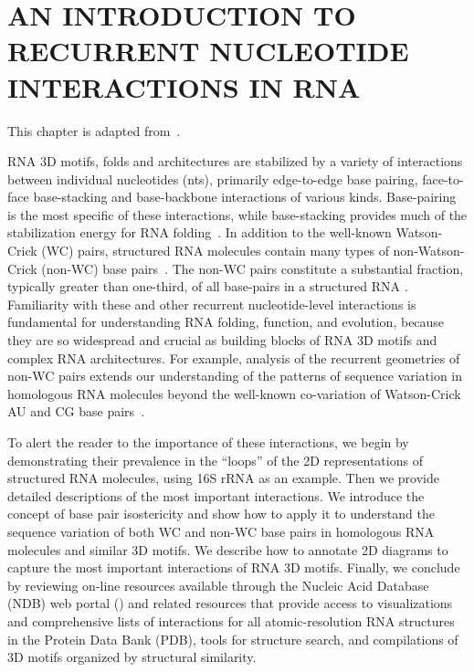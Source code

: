 \chapter{AN INTRODUCTION TO RECURRENT NUCLEOTIDE INTERACTIONS IN RNA}

This chapter is adapted from~\cite{Sweeney2014}. 

RNA 3D motifs, folds and architectures are stabilized by a variety of
interactions between individual nucleotides (nts), primarily edge-to-edge base
pairing, face-to-face base-stacking and base-backbone interactions of various
kinds. Base-pairing is the most specific of these interactions, while
base-stacking provides much of the stabilization energy for RNA folding~\cite{Sponer2013}. In addition to the well-known Watson-Crick (WC) pairs,
structured RNA molecules contain many types of non-Watson-Crick (non-WC) base
pairs~\cite{Leontis2001}. The non-WC pairs constitute a substantial fraction,
typically greater than one-third, of all base-pairs in a structured RNA
\cite{Stombaugh2009}. Familiarity with these and other recurrent
nucleotide-level interactions is fundamental for understanding RNA folding,
function, and evolution, because they are so widespread and crucial as building
blocks of RNA 3D motifs and complex RNA architectures. For example, analysis of
the recurrent geometries of non-WC pairs extends our understanding of the
patterns of sequence variation in homologous RNA molecules beyond the well-known
co-variation of Watson-Crick AU and CG base pairs~\cite{Dutheil2010b,
Leontis2002f}.

To alert the reader to the importance of these interactions, we begin by
demonstrating their prevalence in the ``loops'' of the 2D representations of
structured RNA molecules, using \EC{} 16S rRNA as an example. Then we provide
detailed descriptions of the most important interactions. We introduce the
concept of base pair isostericity and show how to apply it to understand the
sequence variation of both WC and non-WC base pairs in homologous RNA molecules
and similar 3D motifs. We describe how to annotate 2D diagrams to capture the
most important interactions of RNA 3D motifs. Finally, we conclude by reviewing
on-line resources available through the Nucleic Acid Database (NDB) web portal
() and related resources that provide access
to visualizations and comprehensive lists of interactions for all
atomic-resolution RNA structures in the Protein Data Bank (PDB), tools for
structure search, and compilations of 3D motifs organized by structural
similarity. 

